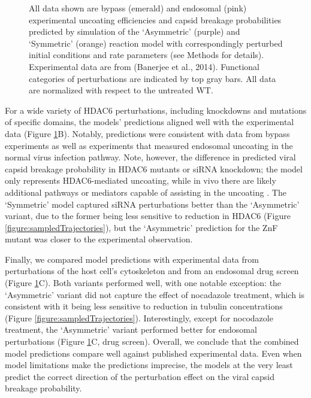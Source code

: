 \begin{figure}
\begin{center}
{All data shown are bypass (emerald) and endosomal (pink) experimental uncoating efficiencies and capsid breakage probabilities predicted by simulation of the ‘Asymmetric’ (purple) and ‘Symmetric’ (orange) reaction model with correspondingly perturbed initial conditions and rate parameters (see Methods for details). Experimental data are from (Banerjee et al., 2014). Functional categories of perturbations are indicated by top gray bars. All data are normalized with respect to the untreated WT.
}
\label{figure:reactionModelPredictions}
\end{center}
\end{figure}

For a wide variety of HDAC6 perturbations, including knockdowns and mutations of specific domains, the models’ predictions aligned well with the experimental data (Figure \ref{figure:reactionModelPredictions}B). Notably, predictions were consistent with data from bypass experiments as well as experiments that measured endosomal uncoating in the normal virus infection pathway. Note, however, the difference in predicted viral capsid breakage probability in HDAC6 mutants or siRNA knockdown; the model only represents HDAC6-mediated uncoating, while in vivo there are likely additional pathways or mediators capable of assisting in the uncoating \cite{gschweitl2016spopl,huotari2012cullin,miyake2019influenza,su2013pooled,yanguez2018phosphoproteomic}. The ‘Symmetric’ model captured siRNA perturbations better than the ‘Asymmetric’ variant, due to the former being less sensitive to reduction in HDAC6 (Figure \ref{figure:sampledTrajectories}), but the ‘Asymmetric’ prediction for the ZnF mutant was closer to the experimental observation.

Finally, we compared model predictions with experimental data from perturbations of the host cell’s cytoskeleton and from an endosomal drug screen \cite{banerjee2014influenza} (Figure \ref{figure:reactionModelPredictions}C). Both variants performed well, with one notable exception: the ‘Asymmetric’ variant did not capture the effect of nocadazole treatment, which is consistent with it being less sensitive to reduction in tubulin concentrations (Figure \ref{figure:sampledTrajectories}). Interestingly, except for nocodazole treatment, the ‘Asymmetric’ variant performed better for endosomal perturbations (Figure \ref{figure:reactionModelPredictions}C, drug screen). Overall, we conclude that the combined model predictions compare well against published experimental data. Even when model limitations make the predictions imprecise, the models at the very least predict the correct direction of the perturbation effect on the viral capsid breakage probability. 

